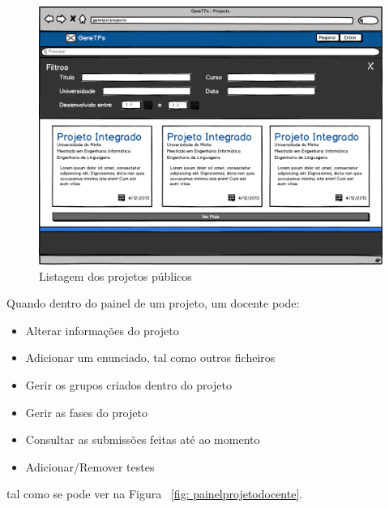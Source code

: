 \begin{figure}[H]
        \centering
        \includegraphics[width=1\textwidth]{images/prototipos/mockups/Projetos.png}
         \caption{Listagem dos projetos públicos}
         \label{fig: projetospublicos}
\end{figure}

Quando dentro do painel de um projeto, um docente pode:

\begin{itemize}
        \item Alterar informações do projeto
	\item Adicionar um enunciado, tal como outros ficheiros
	\item Gerir os grupos criados dentro do projeto
	\item Gerir as fases do projeto
	\item Consultar as submissões feitas até ao momento
        \item Adicionar/Remover testes
\end{itemize}
tal como se pode ver na Figura ~\ref{fig: painelprojetodocente}.\\

